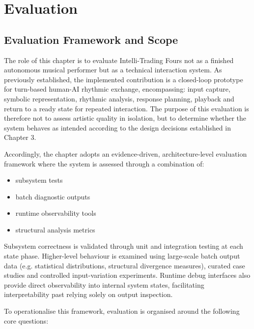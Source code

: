 \chapter{Evaluation}\label{evaluation}

\section{Evaluation Framework and Scope}\label{evaluation-framework-and-scope}

The role of this chapter is to evaluate Intelli-Trading Fours not as a
finished autonomous musical performer but as a technical interaction
system. As previously established, the implemented contribution is a
closed-loop prototype for turn-based human-AI rhythmic exchange,
encompassing: input capture, symbolic representation, rhythmic analysis,
response planning, playback and return to a ready state for repeated
interaction. The purpose of this evaluation is therefore not to assess
artistic quality in isolation, but to determine whether the system
behaves as intended according to the design decisions established in
Chapter 3.

Accordingly, the chapter adopts an evidence-driven, architecture-level
evaluation framework where the system is assessed through a combination
of:

\begin{itemize}
\item
  subsystem tests
\item
  batch diagnostic outputs
\item
  runtime observability tools
\item
  structural analysis metrics
\end{itemize}

Subsystem correctness is validated through unit and integration testing
at each state phase. Higher-level behaviour is examined using
large-scale batch output data (e.g. statistical distributions,
structural divergence measures), curated case studies and controlled
input-variation experiments. Runtime debug interfaces also provide
direct observability into internal system states, facilitating
interpretability past relying solely on output inspection.

To operationalise this framework, evaluation is organised around the
following core questions:

